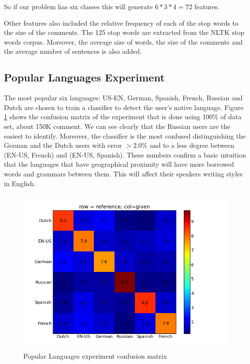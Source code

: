 \documentclass[11pt]{article}
\begin{document}
So if our problem has six classes this will generate $6*3*4 = 72$ features.

Other features also included the relative frequency of each of the stop words to the size of the comments. The  125 stop words are extracted from the NLTK stop words corpus. Moreover, the average size of words, the size of the comments and the average number  of sentences is also added.

\subsection{Popular Languages Experiment}
The most popular six languages: US-EN, German, Spanish, French, Russian and Dutch  are chosen to train a classifier to detect the user's native language. Figure \ref{pop_cfm} shows the confusion matrix of the experiment that is done using 100\% of data set, about 150K comment. We can see clearly that the Russian users are the easiest to identify. Moreover, the classifier is the most confused distinguishing the German and the Dutch users with error $>2.0\%$ and to a less degree between (EN-US, French) and (EN-US, Spanish). These numbers confirm a basic intuition that the languages that have geographical proximity will have more borrowed words and grammars between them. This will affect their speakers writing styles in English.




\begin{figure}[htp]
\centering
\includegraphics[scale=0.45]{popular_cfm.png}
\caption{Popular Languages experiment confusion matrix}
\label{pop_cfm}
\end{figure}
\end{document}
